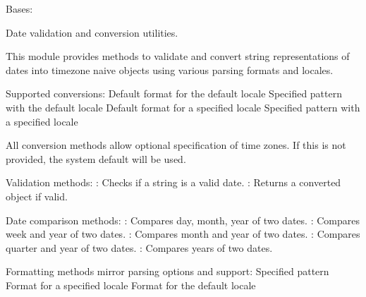 \documentclass[letterpaper,10pt,english]{sphinxmanual}
\begin{document}
\begin{fulllineitems}
\label{\detokenize{apache_commons_validator_python.routines:apache_commons_validator_python.routines.date_validator.DateValidator}}
\pysigstartsignatures
{}
\pysigstopsignatures
\sphinxAtStartPar
Bases: 

\sphinxAtStartPar
Date validation and conversion utilities.

\sphinxAtStartPar
This module provides methods to validate and convert string representations
of dates into timezone naive  objects using various parsing formats and locales.

\sphinxAtStartPar
Supported conversions:
\sphinxhyphen{} Default format for the default locale
\sphinxhyphen{} Specified pattern with the default locale
\sphinxhyphen{} Default format for a specified locale
\sphinxhyphen{} Specified pattern with a specified locale

\sphinxAtStartPar
All conversion methods allow optional specification of time zones.
If this is not provided, the system default will be used.

\sphinxAtStartPar
Validation methods:
\sphinxhyphen{} : Checks if a string is a valid date.
\sphinxhyphen{} : Returns a converted  object if valid.

\sphinxAtStartPar
Date comparison methods:
\sphinxhyphen{} : Compares day, month, year of two dates.
\sphinxhyphen{} : Compares week and year of two dates.
\sphinxhyphen{} : Compares month and year of two dates.
\sphinxhyphen{} : Compares quarter and year of two dates.
\sphinxhyphen{} : Compares years of two dates.

\sphinxAtStartPar
Formatting methods mirror parsing options and support:
\sphinxhyphen{} Specified pattern
\sphinxhyphen{} Format for a specified locale
\sphinxhyphen{} Format for the default locale


\end{fulllineitems}
\end{document}

